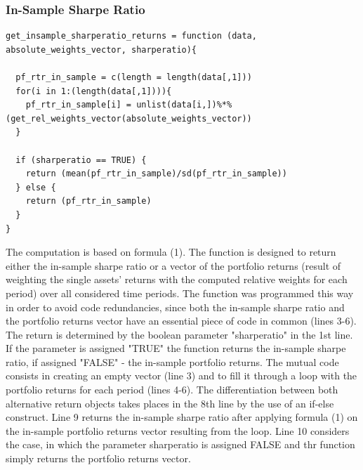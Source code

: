 \documentclass{article}
\begin{document}
\subsubsection{In-Sample Sharpe Ratio}
\begin{lstlisting}[caption={This example shows how the in-sample sharpe ratio and the in-sample portfolio returns are computed in R.}, label=code:1, frame=single]
get_insample_sharperatio_returns = function (data, absolute_weights_vector, sharperatio){
  
  pf_rtr_in_sample = c(length = length(data[,1]))
  for(i in 1:(length(data[,1]))){
    pf_rtr_in_sample[i] = unlist(data[i,])%*%(get_rel_weights_vector(absolute_weights_vector))
  }
  
  if (sharperatio == TRUE) {
    return (mean(pf_rtr_in_sample)/sd(pf_rtr_in_sample)) 
  } else { 
    return (pf_rtr_in_sample)
  }
}
\end{lstlisting}
The computation is based on formula (1). The function is designed to return either the in-sample sharpe ratio or a vector of the portfolio returns (result of weighting the single assets' returns with the computed relative weights for each period) over all considered time periods. The function was programmed this way in order to avoid code redundancies, since both the in-sample sharpe ratio and the portfolio returns vector have an essential piece of code in common (lines 3-6). The return is determined by the boolean parameter "sharperatio" in the 1st line. If the parameter is assigned "TRUE" the function returns the in-sample sharpe ratio, if assigned "FALSE" - the in-sample portfolio returns. The mutual code consists in creating an empty vector (line 3) and to fill it through a loop with the portfolio returns for each period (lines 4-6). The differentiation between both alternative return objects takes places in the 8th line by the use of an if-else construct. Line 9 returns the in-sample sharpe ratio after applying formula (1) on the in-sample portfolio returns vector resulting from the loop. Line 10 considers the case, in which the parameter sharperatio is assigned FALSE and thr function simply returns the portfolio returns vector.
\end{document}
